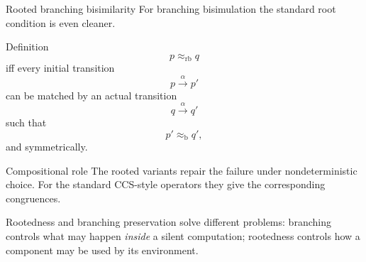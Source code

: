 \documentclass[handout,aspectratio=169,11pt]{beamer}
\newcommand{\step}[1]{\xrightarrow{#1}}
\newcommand{\Takeaway}[1]{\begin{exampleblock}{}#1\end{exampleblock}}
\begin{document}
\begin{frame}{Rooted branching bisimilarity}
  For branching bisimulation the standard root condition is even cleaner.

  \begin{block}{Definition}
    \[
       p\approx_{\mathrm{rb}}q
    \]
    iff every initial transition
    \[
       p\step{\alpha}p'
    \]
    can be matched by an actual transition
    \[
       q\step{\alpha}q'
    \]
    such that
    \[
       p'\approx_{\mathrm b}q',
    \]
    and symmetrically.
  \end{block}


\end{frame}


\begin{frame}
 \begin{block}{Compositional role}
    The rooted variants repair the failure under nondeterministic choice.
    For the standard CCS-style operators they give the corresponding
    congruences.
  \end{block}

  \Takeaway{Rootedness and branching preservation solve different problems:
  branching controls what may happen \emph{inside} a silent computation;
  rootedness controls how a component may be used by its environment.}
\end{frame}
\end{document}
